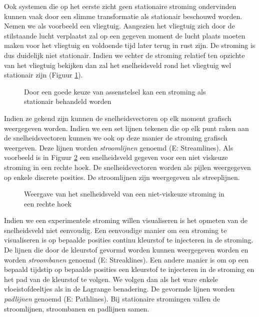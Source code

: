 Ook systemen die op het eerste zicht geen stationaire stroming ondervinden kunnen vaak door een slimme transformatie als stationair beschouwd worden. Nemen we als voorbeeld een vliegtuig. Aangezien het vliegtuig zich door de stilstaande lucht verplaatst zal op een gegeven moment de lucht plaats moeten maken voor het vliegtuig en voldoende tijd later terug in rust zijn. De stroming is dus duidelijk niet stationair. Indien we echter de stroming relatief ten opzichte van het vliegtuig bekijken dan zal het snelheidsveld rond het vliegtuig wel stationair zijn (Figuur \ref{fig:stationaire stroming vliegtuig}). 
\begin{figure}[htb]
	\centering
	
	\caption{Door een goede keuze van assenstelsel kan een stroming als stationair behandeld worden}
	\label{fig:stationaire stroming vliegtuig}
\end{figure}

Indien ze gekend zijn kunnen de snelheidsvectoren op elk moment grafisch weergegeven worden. Indien we een set lijnen tekenen die op elk punt raken aan de snelheidsvectoren kunnen we ook op deze manier de stroming grafisch weergeven. Deze lijnen worden \emph{stroomlijnen} genoemd (E: Streamlines). Als voorbeeld is in Figuur \ref{fig:snelheidsveld} een snelheidsveld gegeven voor een niet viskeuze stroming in een rechte hoek. De snelheidsvectoren worden als pijlen weergegeven op enkele discrete posities. De stroomlijnen zijn weergegeven als streeplijnen.
\begin{figure}[htb]
	\centering
	
	\caption{Weergave van het snelheidsveld van een niet-viskeuze stroming in een rechte hoek}
	\label{fig:snelheidsveld}
\end{figure}
Indien we een experimentele stroming willen visualiseren is het opmeten van de snelheidsveld niet eenvoudig. Een eenvoudige manier om een stroming te visualiseren is op bepaalde posities continu kleurstof te injecteren in de stroming. De lijnen die door de kleurstof gevormd worden kunnen weergegeven worden en worden \emph{stroombanen} genoemd (E: Streaklines).
Een andere manier is om op een bepaald tijdstip op bepaalde posities een kleurstof te injecteren in de stroming en het pad van de kleurstof te volgen. We volgen dan als het ware enkele vloeistofdeeltjes als in de Lagrange benadering. De gevormde lijnen worden \emph{padlijnen} genoemd (E: Pathlines).
Bij stationaire stromingen vallen de stroomlijnen, stroombanen en padlijnen samen.

